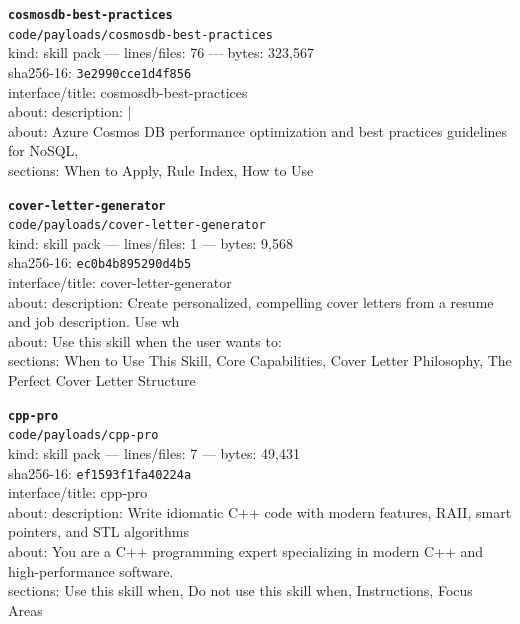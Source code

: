 \noindent\textbf{\texttt{cosmosdb-best-practices}}\\
\texttt{code/payloads/cosmosdb-best-practices}\\
kind: skill pack --- lines/files: 76 --- bytes: 323,567\\
sha256-16: \texttt{3e2990cce1d4f856}\\
interface/title: cosmosdb-best-practices\\
about: description: |\\
about: Azure Cosmos DB performance optimization and best practices guidelines for NoSQL,\\
sections: When to Apply, Rule Index, How to Use\\
\vspace*{6.0pt}

\noindent\textbf{\texttt{cover-letter-generator}}\\
\texttt{code/payloads/cover-letter-generator}\\
kind: skill pack --- lines/files: 1 --- bytes: 9,568\\
sha256-16: \texttt{ec0b4b895290d4b5}\\
interface/title: cover-letter-generator\\
about: description: Create personalized, compelling cover letters from a resume and job description. Use wh\\
about: Use this skill when the user wants to:\\
sections: When to Use This Skill, Core Capabilities, Cover Letter Philosophy, The Perfect Cover Letter Structure\\
\vspace*{6.0pt}
\newpage

\noindent\textbf{\texttt{cpp-pro}}\\
\texttt{code/payloads/cpp-pro}\\
kind: skill pack --- lines/files: 7 --- bytes: 49,431\\
sha256-16: \texttt{ef1593f1fa40224a}\\
interface/title: cpp-pro\\
about: description: Write idiomatic C++ code with modern features, RAII, smart pointers, and STL algorithms\\
about: You are a C++ programming expert specializing in modern C++ and high-performance software.\\
sections: Use this skill when, Do not use this skill when, Instructions, Focus Areas\\
\vspace*{6.0pt}

